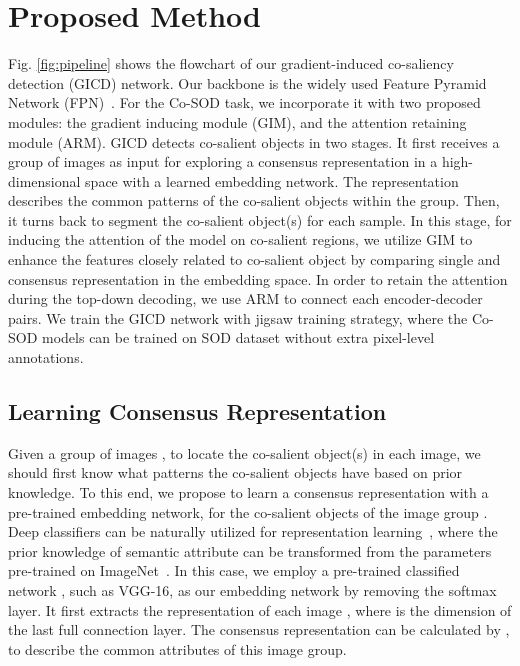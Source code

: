 \documentclass[runningheads,orivec]{llncs}
\newcommand{\figref}[1]{Fig. \ref{#1}}
\begin{document}
\section{Proposed Method}
\figref{fig:pipeline} shows the flowchart of our gradient-induced co-saliency detection (GICD) network.
Our backbone is the widely used Feature Pyramid Network (FPN)~\cite{lin2017feature}. 
For the Co-SOD task, we incorporate it with two proposed modules: the gradient inducing module (GIM), and the attention retaining module (ARM).
GICD detects co-salient objects in two stages.
It first receives a group of images as input for exploring a consensus representation in a high-dimensional space with a learned embedding network.
The representation describes the common patterns of the co-salient objects within the group.
Then, 
it turns back to segment the co-salient object(s) for each sample.
In this stage,
for inducing the attention of the model on co-salient regions,
we utilize GIM to enhance the features closely related to co-salient object by comparing single and consensus representation in the embedding space.
In order to retain the attention during the top-down decoding, we use ARM to connect each encoder-decoder pairs.
We train the GICD network with jigsaw training strategy, where the Co-SOD models can be trained on SOD dataset without extra pixel-level annotations.



\subsection{Learning Consensus Representation}
Given a group of images , to locate the co-salient object(s) in each image, we should first know what patterns the co-salient objects have based on prior knowledge.
To this end, we propose to learn a consensus representation with a pre-trained embedding network, for the co-salient objects of the image group .
Deep classifiers can be naturally utilized for representation learning~\cite{qi2018low}, where the prior knowledge of semantic attribute can be transformed from the parameters pre-trained on ImageNet~\cite{deng2009imagenet}.
In this case,
we employ a pre-trained classified network , such as VGG-16, as our embedding network by removing the softmax layer.
It first extracts the representation  of each image , 
where  is the dimension of the last full connection layer.
The consensus representation  can be calculated by , to describe the common attributes of this image group.
\end{document}
